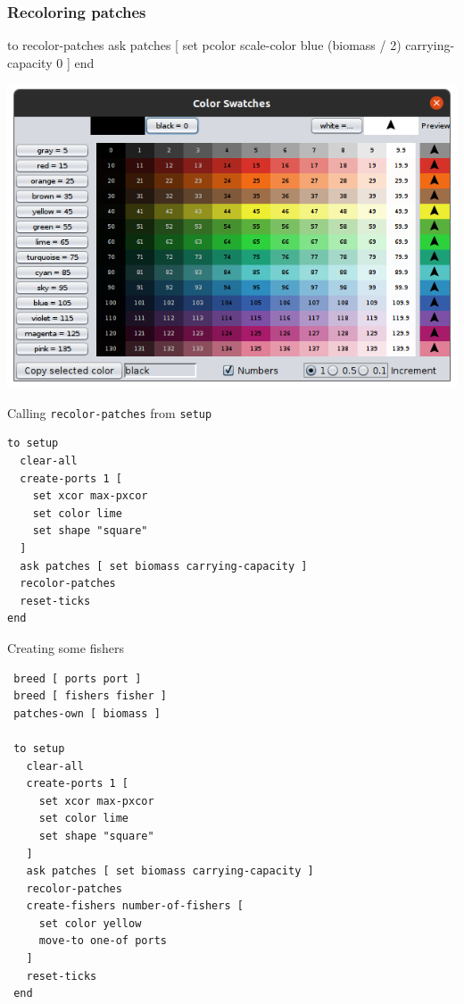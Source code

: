 \documentclass[table, 14pt, aspectratio=169]{beamer}
\begin{document}
\begin{frame}[fragile=singleslide]\frametitle{Recoloring patches}
  \centering
  \begin{adjustbox}{max width=\linewidth}
    \begin{nlogo}
to recolor-patches
  ask patches [
    set pcolor scale-color blue (biomass / 2) carrying-capacity 0
  ]
end
    \end{nlogo}
  \end{adjustbox}
  \vfill
  \includegraphics[width=0.7\textheight]{images/swatches.png}
\end{frame}

\begin{frame}[fragile=singleslide]{Calling \texttt{recolor-patches} from \texttt{setup}}\small
  \begin{verbatim}
to setup
  clear-all
  create-ports 1 [
    set xcor max-pxcor
    set color lime
    set shape "square"
  ]
  ask patches [ set biomass carrying-capacity ]
  recolor-patches
  reset-ticks
end
  \end{verbatim}  
\end{frame}

\begin{frame}[fragile=singleslide]{Creating some fishers}\scriptsize
  \begin{verbatim}
 breed [ ports port ]
 breed [ fishers fisher ]
 patches-own [ biomass ]
 
 to setup
   clear-all
   create-ports 1 [
     set xcor max-pxcor
     set color lime
     set shape "square"
   ]
   ask patches [ set biomass carrying-capacity ]
   recolor-patches  
   create-fishers number-of-fishers [
     set color yellow
     move-to one-of ports
   ]
   reset-ticks
 end
  \end{verbatim}  
\end{frame}
\end{document}
